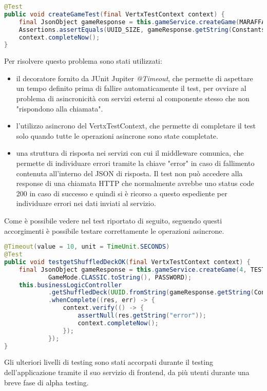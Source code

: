 \begin{lstlisting}[language=Java, caption={Standard Vertx test}, label=list:test_std_vertx]
@Test
public void createGameTest(final VertxTestContext context) {
    final JsonObject gameResponse = this.gameService.createGame(MARAFFA_PLAYERS, TEST_USER, EXPECTED_SCORE, GAME_MODE.toString(), PASSWORD);
    Assertions.assertEquals(UUID_SIZE, gameResponse.getString(Constants.GAME_ID).length()); // Assuming UUID is 36
    context.completeNow();
}
\end{lstlisting}

Per risolvere questo problema sono stati utilizzati:
\begin{itemize}
    \item il decoratore fornito da JUnit Jupiter \textit{@Timeout}, che permette di aspettare un tempo definito prima di fallire automaticamente il test, per ovviare al problema di asincronicità con servizi esterni al componente stesso che non "rispondono alla chiamata".
    \item l'utilizzo asincrono del VertxTestContext, che permette di completare il test solo quando tutte le operazioni asincrone sono state completate.
    \item una struttura di risposta nei servizi con cui il middleware comunica, che permette di individuare errori tramite la chiave "error" in caso di fallimento contenuta all'interno del JSON di risposta. Il test non può accedere alla response di una chiamata HTTP che normalmente avrebbe uno status code 200 in caso di successo e quindi si è ricorso a questo espediente per individuare errori nei dati inviati al servizio.
\end{itemize}

Come è possibile vedere nel test riportato di seguito, seguendo questi accorgimenti è possibile testare correttamente le operazioni asincrone.

\begin{lstlisting}[language=Java, caption={Vertx test asincrono}, label=list:test_async_vertx]
@Timeout(value = 10, unit = TimeUnit.SECONDS)
@Test
public void testgetShuffledDeckOK(final VertxTestContext context) {
    final JsonObject gameResponse = this.gameService.createGame(4, TEST_USER, 41,
            GameMode.CLASSIC.toString(), PASSWORD);
    this.businessLogicController
            .getShuffledDeck(UUID.fromString(gameResponse.getString(Constants.GAME_ID)), 4)
            .whenComplete((res, err) -> {
                context.verify(() -> {
                    assertNull(res.getString("error"));
                    context.completeNow();
                });
            });
}
\end{lstlisting}


Gli ulteriori livelli di testing sono stati accorpati durante il testing dell'applicazione tramite il suo servizio di frontend, da più utenti durante una breve fase di alpha testing.
